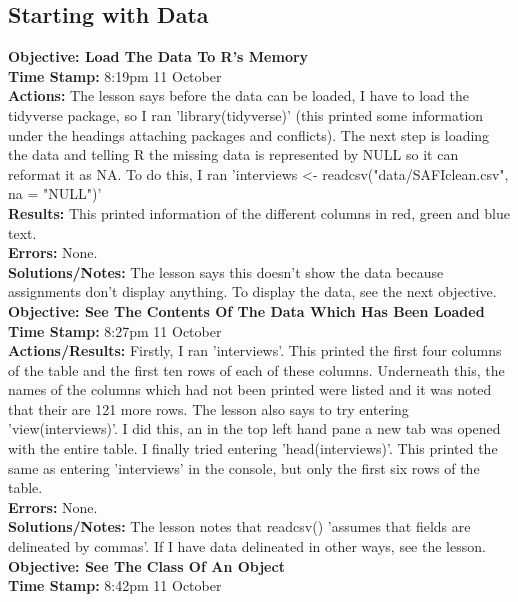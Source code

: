 \documentclass{article}
\begin{document}
\begin{FlushLeft}
\subsection{Starting with Data}
\textbf{Objective: Load The Data To R's Memory}\\ 
\textbf{Time Stamp:} 8:19pm 11 October\\
\textbf{Actions:} The lesson says before the data can be loaded, I have to load the tidyverse package, so I ran 'library(tidyverse)' (this printed some information under the headings attaching packages and conflicts). The next step is loading the data and telling R the missing data is represented by NULL so it can reformat it as NA. To do this, I ran 'interviews <- read\textunderscore csv("data/SAFI\textunderscore clean.csv", na = "NULL")' \\
\textbf{Results:} This printed information of the different columns in red, green and blue text.\\
\textbf{Errors:} None.\\
\textbf{Solutions/Notes:} The lesson says this doesn't show the data because assignments don't display anything. To display the data, see the next objective.\\
\vspace{5mm}
\textbf{Objective: See The Contents Of The Data Which Has Been Loaded}\\ 
\textbf{Time Stamp:} 8:27pm 11 October\\
\textbf{Actions/Results:} Firstly, I ran 'interviews'. This printed the first four columns of the table and the first ten rows of each of these columns. Underneath this, the names of the columns which had not been printed were listed and it was noted that their are 121 more rows. The lesson also says to try entering 'view(interviews)'. I did this, an in the top left hand pane a new tab was opened with the entire table. I finally tried entering 'head(interviews)'. This printed the same as entering 'interviews' in the console, but only the first six rows of the table.\\
\textbf{Errors:} None.\\
\textbf{Solutions/Notes:} The lesson notes that read\textunderscore csv() 'assumes that fields are delineated by commas'. If I have data delineated in other ways, see the lesson.\\
\vspace{5mm}
\textbf{Objective: See The Class Of An Object}\\ 
\textbf{Time Stamp:} 8:42pm 11 October\\

\end{FlushLeft}
\end{document}
